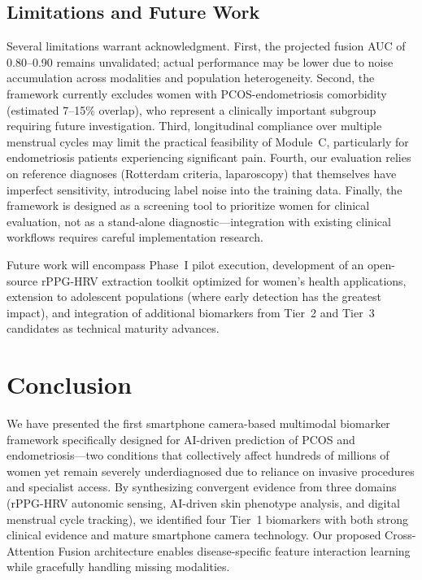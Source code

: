 \documentclass[conference]{IEEEtran}
\begin{document}
\subsection{Limitations and Future Work}

Several limitations warrant acknowledgment. First, the projected fusion AUC of 0.80--0.90 remains unvalidated; actual performance may be lower due to noise accumulation across modalities and population heterogeneity. Second, the framework currently excludes women with PCOS-endometriosis comorbidity (estimated 7--15\% overlap), who represent a clinically important subgroup requiring future investigation. Third, longitudinal compliance over multiple menstrual cycles may limit the practical feasibility of Module~C, particularly for endometriosis patients experiencing significant pain. Fourth, our evaluation relies on reference diagnoses (Rotterdam criteria, laparoscopy) that themselves have imperfect sensitivity, introducing label noise into the training data. Finally, the framework is designed as a screening tool to prioritize women for clinical evaluation, not as a stand-alone diagnostic---integration with existing clinical workflows requires careful implementation research.

Future work will encompass Phase~I pilot execution, development of an open-source rPPG-HRV extraction toolkit optimized for women's health applications, extension to adolescent populations (where early detection has the greatest impact), and integration of additional biomarkers from Tier~2 and Tier~3 candidates as technical maturity advances.

\section{Conclusion}

We have presented the first smartphone camera-based multimodal biomarker framework specifically designed for AI-driven prediction of PCOS and endometriosis---two conditions that collectively affect hundreds of millions of women yet remain severely underdiagnosed due to reliance on invasive procedures and specialist access. By synthesizing convergent evidence from three domains (rPPG-HRV autonomic sensing, AI-driven skin phenotype analysis, and digital menstrual cycle tracking), we identified four Tier~1 biomarkers with both strong clinical evidence and mature smartphone camera technology. Our proposed Cross-Attention Fusion architecture enables disease-specific feature interaction learning while gracefully handling missing modalities.
\end{document}
